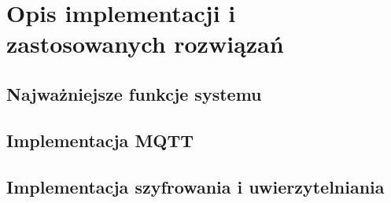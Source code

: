 \section{Opis implementacji i zastosowanych rozwiązań}
\subsection{Najważniejsze funkcje systemu}
\subsection{Implementacja MQTT}
\subsection{Implementacja szyfrowania i uwierzytelniania}

